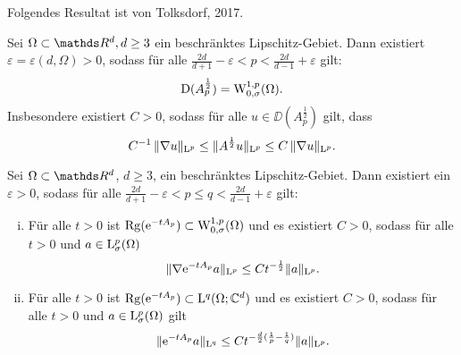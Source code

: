 Folgendes Resultat ist von Tolksdorf, 2017.

\begin{hsatz}
  \label{hsatz:tolksdorf}
  Sei $\Omega \subset \R^d, d \geq 3$ ein beschränktes Lipschitz-Gebiet.
  Dann existiert $\varepsilon = \varepsilon(d,\Omega) > 0$, sodass für alle 
  $
  \frac{2d}{d + 1} - \varepsilon < p < \frac{2d}{d - 1} + \varepsilon
  $
  gilt:
  $$
  \mathrm{D}(A_p^{\frac{1}{2}}) = \mathrm{W}_{0,\sigma}^{1,p}(\Omega).
  $$
  Insbesondere existiert $C > 0$, sodass für alle $u \in \DD(A_p^{\frac{1}{2}})$ gilt, dass
  $$
  C^{-1} \, \|\nabla u\|_{\mathrm{L}^p} \leq \| A^{\frac{1}{2}} u\|_{\mathrm{L}^p} \leq C \, \|\nabla u\|_{\mathrm{L}^p}.
  $$
\end{hsatz}

\begin{thm}
  \label{thm:lplqSmoothing}
  Sei $\Omega \subset \R^d$, $d \geq 3$, ein beschränktes Lipschitz-Gebiet.
  Dann existiert ein $\varepsilon >0$, sodass für alle $\frac{2d}{d + 1} - \varepsilon < p \leq q < \frac{2d}{d - 1} + \varepsilon$ gilt:
  \begin{enumerate}[i)]
    \item Für alle $t > 0$ ist $\operatorname{Rg}(\mathrm{e}^{-tA_p}) \subset \mathrm{W}_{0,\sigma}^{1,p}(\Omega)$ und es existiert $C > 0$, sodass für alle $t > 0$ und $a \in \mathrm{L}_\sigma^p(\Omega)$
      $$
      \|\nabla \mathrm{e}^{-tA_p} a \|_{\mathrm{L}^p} \leq C t^{-\frac{1}{2}} \|a\|_{\mathrm{L}^p}.
      $$
    \item Für alle $t > 0$ ist $\operatorname{Rg}(\mathrm{e}^{-t A_p}) \subset \mathrm{L}^q(\Omega; \mathbb{C}^d)$ und es existiert $C > 0$, sodass für alle $t > 0$ und $a \in \mathrm{L}_\sigma^p(\Omega)$ gilt
      $$
      \|\mathrm{e}^{-tA_p} a\|_{\mathrm{L}^q} \leq C t^{-\frac{d}{2}(\frac{1}{p} - \frac{1}{q})} \|a\|_{\mathrm{L}^p}.
      $$
  \end{enumerate}
\end{thm}

